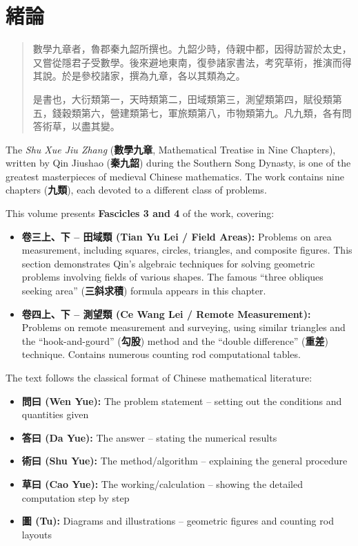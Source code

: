 \documentclass[11pt,a4paper]{article}
\begin{document}
\section*{緒論}

\begin{quote}
\textcolor{chinacolor}{%
數學九章者，魯郡秦九韶所撰也。九韶少時，侍親中都，因得訪習於太史，又嘗從隱君子受數學。後來避地東南，復參諸家書法，考究草術，推演而得其說。於是參校諸家，撰為九章，各以其類為之。

是書也，大衍類第一，天時類第二，田域類第三，測望類第四，賦役類第五，錢穀類第六，營建類第七，軍旅類第八，市物類第九。凡九類，各有問答術草，以盡其變。
}
\end{quote}

The \textit{Shu Xue Jiu Zhang} (\textbf{數學九章}, Mathematical Treatise in Nine Chapters), 
written by Qin Jiushao (\textbf{秦九韶}) during the Southern Song Dynasty, 
is one of the greatest masterpieces of medieval Chinese mathematics. The work 
contains nine chapters (\textbf{九類}), each devoted to a different class of problems.

This volume presents \textbf{Fascicles 3 and 4} of the work, covering:

\begin{itemize}
  \item \textbf{卷三上、下 -- 田域類 (Tian Yu Lei / Field Areas):} Problems on area measurement, 
    including squares, circles, triangles, and composite figures. This section 
    demonstrates Qin's algebraic techniques for solving geometric problems 
    involving fields of various shapes. The famous ``three obliques seeking area'' 
    (\textbf{三斜求積}) formula appears in this chapter.
  
  \item \textbf{卷四上、下 -- 測望類 (Ce Wang Lei / Remote Measurement):} Problems on remote 
    measurement and surveying, using similar triangles and the ``hook-and-gourd'' 
    (\textbf{勾股}) method and the ``double difference'' (\textbf{重差}) technique. 
    Contains numerous counting rod computational tables.
\end{itemize}

The text follows the classical format of Chinese mathematical literature:
\begin{itemize}
  \item \textbf{問曰 (Wen Yue):} The problem statement -- setting out the conditions and quantities given
  \item \textbf{答曰 (Da Yue):} The answer -- stating the numerical results
  \item \textbf{術曰 (Shu Yue):} The method/algorithm -- explaining the general procedure
  \item \textbf{草曰 (Cao Yue):} The working/calculation -- showing the detailed computation step by step
  \item \textbf{圖 (Tu):} Diagrams and illustrations -- geometric figures and counting rod layouts
\end{itemize}
\end{document}
